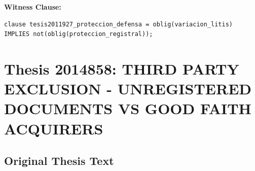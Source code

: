 \documentclass[11pt,a4paper]{article}
\begin{document}
\textbf{Witness Clause:}

\begin{lstlisting}[style=witnessstyle, language=Witness]
clause tesis2011927_proteccion_defensa = oblig(variacion_litis) IMPLIES not(oblig(proteccion_registral));
\end{lstlisting}

\newpage

\section{Thesis 2014858: THIRD PARTY EXCLUSION - UNREGISTERED DOCUMENTS VS GOOD FAITH ACQUIRERS}
\label{thesis:2014858}

\subsection{Original Thesis Text}
\end{document}
